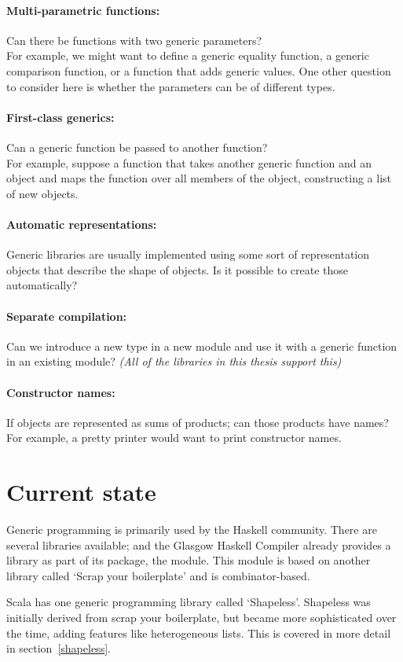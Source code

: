 \paragraph{Multi-parametric functions:} Can there be functions with two generic parameters?
\\
For example, we might want to define a generic equality function, a generic
comparison function, or a function that adds generic values. One other question
to consider here is whether the parameters can be of different types.

\paragraph{First-class generics:} Can a generic function be passed to another function?
\\
For example, suppose a function  that takes another generic function 
and an object and maps the function  over all members of the object, constructing
a list of new objects.

\paragraph{Automatic representations:} Generic libraries are usually implemented
using some sort of representation objects that describe the shape of
objects. Is it possible to create those automatically?

\paragraph{Separate compilation:} Can we introduce a new type in a new module
and use it with a generic function in an existing module?
\textit{(All of the libraries in this thesis support this)}


\paragraph{Constructor names:} If objects are represented as sums of products;
can those products have names?
For example, a pretty printer would want to print constructor names.


\section*{Current state}
Generic programming is primarily used by the Haskell community. There are
several libraries available; and the Glasgow Haskell Compiler already provides
a library as part of its  package, the  module. This
module is based on another library called `Scrap your boilerplate'\cite{DBLP:conf/tldi/LammelJ03}
and is combinator-based.

Scala has one generic programming library called `Shapeless'. Shapeless was
initially derived from scrap your boilerplate, but became more sophisticated
over the time, adding features like heterogeneous lists. This is covered
in more detail in section~\ref{shapeless}.
